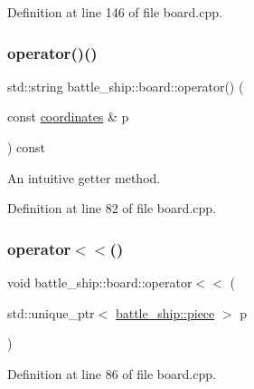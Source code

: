 Definition at line 146 of file board.\+cpp.

\mbox{\label{classbattle__ship_1_1board_a6977bbdbc6ed5855ea538dcec5a22699}} 
\subsubsection{\texorpdfstring{operator()()}{operator()()}}
{\footnotesize\ttfamily std\+::string battle\+\_\+ship\+::board\+::operator() (\begin{DoxyParamCaption}\item[{const \hyperlink{structbattle__ship_1_1coordinates}{coordinates} \&}]{p }\end{DoxyParamCaption}) const}



An intuitive getter method. 



Definition at line 82 of file board.\+cpp.

\mbox{\label{classbattle__ship_1_1board_a9afa4baeef0df47e4a2efe05de9cb8eb}} 
\subsubsection{\texorpdfstring{operator$<$$<$()}{operator<<()}}
{\footnotesize\ttfamily void battle\+\_\+ship\+::board\+::operator$<$$<$ (\begin{DoxyParamCaption}\item[{std\+::unique\+\_\+ptr$<$ \hyperlink{classbattle__ship_1_1piece}{battle\+\_\+ship\+::piece} $>$}]{p }\end{DoxyParamCaption})}



Definition at line 86 of file board.\+cpp.

\mbox{\label{classbattle__ship_1_1board_a4349c045147f686d09cdc47690f15e34}} 
